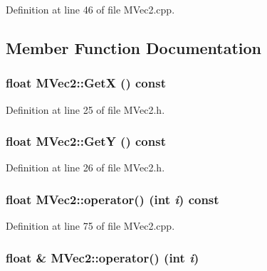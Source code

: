 Definition at line 46 of file MVec2.cpp.

\subsection{Member Function Documentation}
\hypertarget{class_m_vec2_9acc00347809d829118094588c89dd26}{
\subsubsection[{GetX}]{\setlength{\rightskip}{0pt plus 5cm}float MVec2::GetX () const}}
\label{class_m_vec2_9acc00347809d829118094588c89dd26}




Definition at line 25 of file MVec2.h.\hypertarget{class_m_vec2_6899c308d311a8fd1245ae955717720a}{
\subsubsection[{GetY}]{\setlength{\rightskip}{0pt plus 5cm}float MVec2::GetY () const}}
\label{class_m_vec2_6899c308d311a8fd1245ae955717720a}




Definition at line 26 of file MVec2.h.\hypertarget{class_m_vec2_b69d973d47bb3288df0a66277f8b248c}{
\subsubsection[{operator()}]{\setlength{\rightskip}{0pt plus 5cm}float MVec2::operator() (int {\em i}) const}}
\label{class_m_vec2_b69d973d47bb3288df0a66277f8b248c}




Definition at line 75 of file MVec2.cpp.\hypertarget{class_m_vec2_98b7c2eee3931148527ad187704e2247}{
\subsubsection[{operator()}]{\setlength{\rightskip}{0pt plus 5cm}float \& MVec2::operator() (int {\em i})}}
\label{class_m_vec2_98b7c2eee3931148527ad187704e2247}




